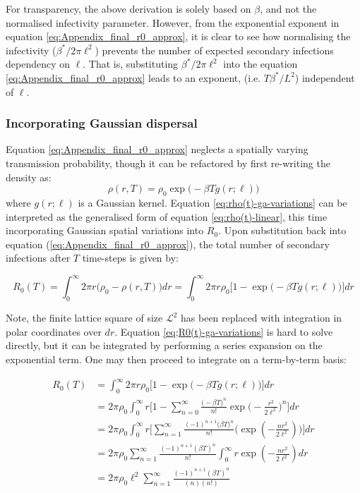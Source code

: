 For transparency, the above derivation is solely based on $\beta$, and not the normalised infectivity parameter. 
However, from the exponential exponent in equation \ref{eq:Appendix_final_r0_approx}, it is clear to see how normalising the infectivity ($\beta^*/2\pi\ell^2$) prevents
the number of expected secondary infections dependency on $\ell$. That is, substituting $\beta^*/2\pi\ell^2$ into the equation \ref{eq:Appendix_final_r0_approx} leads to an exponent, (i.e. $T\beta^*/L^2$) independent of $\ell$.

\subsubsection{Incorporating Gaussian dispersal}

\label{sec:r0-derivation}
Equation \ref{eq:Appendix_final_r0_approx} neglects a spatially varying transmission probability, 
though it can be refactored by first re-writing the density as:
\begin{equation}
\label{eq:rho(t)-ga-variations}
    \rho(r, T) = \rho_0\exp \big(-\beta T g(r; \ell) \big)
\end{equation}
where $g(r;\ell)$ is a Gaussian kernel. 
Equation \ref{eq:rho(t)-ga-variations} can be interpreted as the generalised form of equation \ref{eq:rho(t)-linear}, this time incorporating Gaussian spatial variations into $R_0$.
Upon substitution back into equation (\ref{eq:Appendix_final_r0_approx}), the total number of secondary infections after $T$ time-steps is given by:

\begin{equation}
\label{eq;R0(t)-ga-variations}
   R_0(T) = \int ^\infty _0 2\pi r \big (\rho_0 - \rho(r, T)\big)dr =  \int ^\infty _0 2\pi r \rho_0 \Big[1 - \exp\big(-\beta T g(r;\ell)\big) \Big]dr
\end{equation}

Note, the finite lattice square of size $\mathcal{L}^2$ has been replaced with integration in polar coordinates over $dr$. 
Equation \ref{eq;R0(t)-ga-variations} is hard to solve directly, but it can be integrated by performing a series expansion on the exponential term. 
One may then proceed to integrate on a term-by-term basis:

\begin{equation} 
\label{eq:Appendix_final_expression}
\begin{split}
R_0(T) & = \int^\infty_0 2\pi r \rho_0 \Big[1 - \exp \big( -\beta T g(r;\ell)\big)\Big]dr \\
& = 2\pi\rho_0 \int^\infty _0 r \Big[1 - \sum^\infty_{n=0} \frac{\big(-\beta T)^n}{n!} \exp\big(-\frac{r^2}{2\ell^2}\big)^n  \Big] dr \\
& = 2\pi\rho_0 \int^\infty _0 r \Big[\sum^\infty_{n=1} \frac{(-1)^{n+1}\big(\beta T)^n}{n!} \Big(\exp(-\frac{n r^2}{2\ell^2} ) \Big)  \Big] dr \\
& = 2\pi\rho_0 \sum^{\infty}_{n=1} \frac{(-1)^{n+1} (\beta T)^n}{n!} \int^\infty _0 r \exp(-\frac{n r^2}{2\ell^2})dr  \\
& = 2\pi\rho_0 \ell^2 \sum^{\infty}_{n=1} \frac{(-1)^{n+1}(\beta T)^n}{(n)(n!) }
\end{split}
\end{equation}

